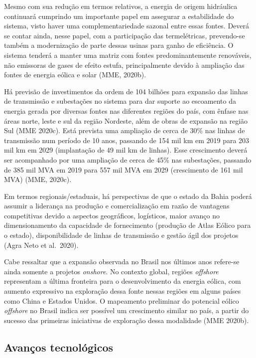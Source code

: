 \documentclass[
  oneside]{scrbook}
\begin{document}
Mesmo com sua redução em termos relativos, a energia de origem hidráulica continuará cumprindo um importante papel em assegurar a estabilidade do sistema, visto haver uma complementariedade sazonal entre essas fontes. Deverá se contar ainda, nesse papel, com a participação das termelétricas, prevendo-se também a modernização de parte dessas usinas para ganho de eficiência. O sistema tenderá a manter uma matriz com fontes predominantemente renováveis, não emissoras de gases de efeito estufa, principalmente devido à ampliação das fontes de energia eólica e solar (MME, 2020b).

Há previsão de investimentos da ordem de 104 bilhões para expansão das linhas de transmissão e subestações no sistema para dar suporte ao escoamento da energia gerada por diversas fontes nas diferentes regiões do país, com ênfase nas áreas norte, leste e sul da região Nordeste, além de obras de expansão na região Sul (MME 2020c). Está prevista uma ampliação de cerca de 30\% nas linhas de transmissão num período de 10 anos, passando de 154 mil km em 2019 para 203 mil km em 2029 (implantação de 49 mil km de linhas). Esse crescimento deverá ser acompanhado por uma ampliação de cerca de 45\% nas subestações, passando de 385 mil MVA em 2019 para 557 mil MVA em 2029 (crescimento de 161 mil MVA) (MME, 2020c).

Em termos regionais/estaduais, há perspectivas de que o estado da Bahia poderá assumir a liderança na produção e comercialização em razão de vantagens competitivas devido a aspectos geográficos, logísticos, maior avanço no dimensionamento da capacidade de fornecimento (produção de Atlas Eólico para o estado), disponibilidade de linhas de transmissão e gestão ágil dos projetos (Agra Neto et al.~2020).

Cabe ressaltar que a expansão observada no Brasil nos últimos anos refere-se ainda somente a projetos \emph{onshore}. No contexto global, regiões \emph{offshore} representam a última fronteira para o desenvolvimento da energia eólica, com aumento expressivo na exploração dessa fonte nessas regiões em alguns países como China e Estados Unidos. O mapeamento preliminar do potencial eólico \emph{offshore} no Brasil indica ser possível um crescimento similar no país, a partir do sucesso das primeiras iniciativas de exploração dessa modalidade (MME 2020b).

\hypertarget{avanuxe7os-tecnoluxf3gicos}{%
\subsection{Avanços tecnológicos}\label{avanuxe7os-tecnoluxf3gicos}}
\end{document}

